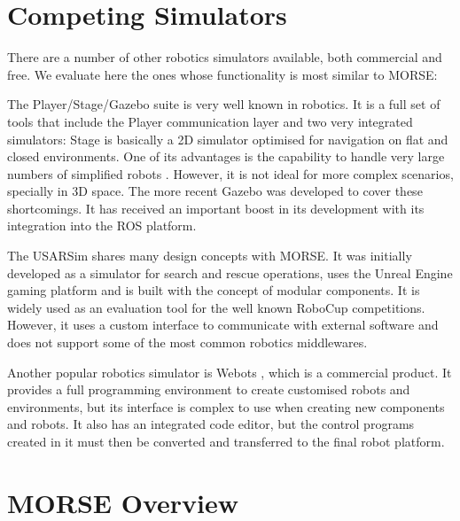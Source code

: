 \documentclass{llncs}
\begin{document}
\section{Competing Simulators}
\label{section:othersims}

There are a number of other robotics simulators available, both commercial and
free. We evaluate here the ones whose functionality is most similar to MORSE:

The Player/Stage/Gazebo suite \cite{psg-1232} is very well known in robotics.
It is a full set of tools that include the Player communication layer and two
very integrated simulators: Stage \cite{Gerkey03theplayer/stage} is basically a
2D simulator optimised for navigation on flat and closed environments.
One of its advantages is the capability to handle very large numbers of
simplified robots \cite{springerlink:10.1007/s11721-008-0014-4}. However, it is
not ideal for more complex scenarios, specially in 3D space.  The more recent
Gazebo \cite{Koenig04designand} was developed to cover these shortcomings.
It has received an important boost in its development with its integration
into the ROS platform.

The USARSim \cite{usarsim-4209284} shares many design concepts with MORSE. It
was initially developed as a simulator for search and rescue operations, uses
the Unreal Engine gaming platform and is built with the concept of modular
components. It is widely used as an evaluation tool for the well known RoboCup
competitions. However, it uses a custom interface to communicate with external
software and does not support some of the most common robotics middlewares.

Another popular robotics simulator is Webots \cite{Webots04}, which is a
commercial product. It provides a full programming environment to create
customised robots and environments, but its interface is complex to use when
creating new components and robots.
It also has an integrated code editor, but the control programs created in it
must then be converted and transferred to the final robot platform.






\section{MORSE Overview}
\label{section:overview}
\end{document}
